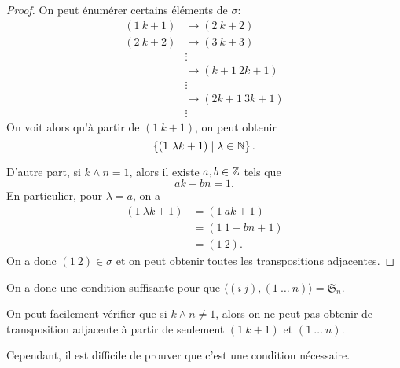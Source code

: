\documentclass[french,a4paper,10pt]{article}
\begin{document}
    \begin{proof}
        On peut énumérer certains éléments de \( \sigma \):
        \begin{equation*}
            \begin{aligned}
                (1~k+1) &\to (2~k+2) \\
                (2~k+2) &\to (3~k+3) \\
                &\vdots \\
                &\to (k+1~2k+1) \\
                &\vdots \\
                &\to (2k+1~3k+1) \\
                &\vdots
            \end{aligned}
        \end{equation*}
        On voit alors qu'à partir de \( (1~k+1) \), on peut obtenir
        \begin{equation*}
            \left\{ (1~\lambda k+1) \mid \lambda \in \mathbb{N} \right\}.
        \end{equation*}

        D'autre part, si \( k\wedge n = 1 \), alors il existe \( a, b \in \mathbb{Z} \) tels que
        \begin{equation*}
            ak + bn = 1.
        \end{equation*}
        En particulier, pour \( \lambda = a \), on a
        \begin{equation*}
            \begin{aligned}
                (1~\lambda k+1) 
                &= (1~ak+1) \\
                &= (1~1-bn +1) \\
                &= (1~2).
            \end{aligned}
        \end{equation*}
        On a donc \( (1~2) \in \sigma \) et on peut obtenir toutes les transpositions adjacentes.
    \end{proof}

    On a donc une condition suffisante pour que \( \langle (i~j), (1~\ldots~n) \rangle = \mathfrak S_n \).
    
    On peut facilement vérifier que si \( k\wedge n \neq 1 \), alors on
    ne peut pas obtenir de transposition adjacente à partir de seulement \( (1~k+1) \) et \( (1~\ldots~n) \).

    Cependant, il est difficile de prouver que c'est une condition nécessaire.
\end{document}
